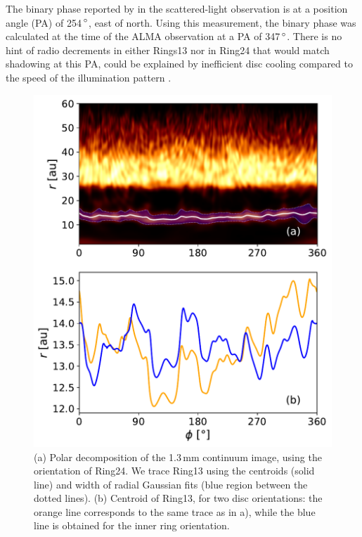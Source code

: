 \documentclass[letters,usenatbib,times]{mnras}
\begin{document}
The binary phase reported by \citet{dOrazi} in the scattered-light observation is at a position angle (PA) of 254\,$\hbox{$^\circ$}$, east of north. Using this measurement, the binary phase was calculated at the time of the ALMA observation at a PA of 347\,$\hbox{$^\circ$}$. There is no hint of radio decrements in either Rings13 nor in Ring24 that would match shadowing at this PA, could be explained by inefficient disc cooling compared to the speed of the illumination pattern \citep{Casassus2019MNRAS.486L..58C}. 

\begin{figure}
    \includegraphics[width=\columnwidth]{polar_ring_aprox_and_diff_inner.pdf}
    \caption{(a) Polar decomposition of the 1.3\,mm continuum image, using the orientation of Ring24. We trace Ring13 using the centroids (solid line) and width of radial Gaussian fits (blue region between the dotted lines). (b) Centroid of Ring13, for two disc orientations: the orange line corresponds to the same trace as in a), while the blue line is obtained for the inner ring orientation.}
    \label{fig:polarring}
\end{figure}
\end{document}
